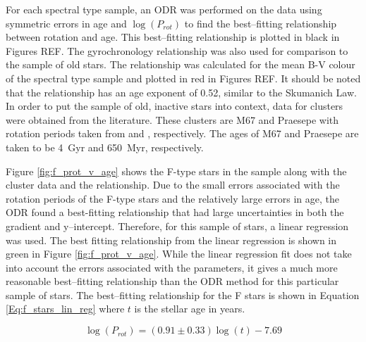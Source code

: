 For each spectral type sample, an ODR was performed on the data using symmetric errors in age and $\log(P_{rot})$ to find the best--fitting relationship between rotation and age. This best--fitting relationship is plotted in black in Figures REF. The \citet{Barnes_2007} gyrochronology relationship was also used for comparison to the sample of old stars. The \citet{Barnes_2007} relationship was calculated for the mean B-V colour of the spectral type sample and plotted in red in Figures REF. It should be noted that the \citet{Barnes_2007} relationship has an age exponent of 0.52, similar to the Skumanich Law. In order to put the sample of old, inactive stars into context, data for clusters were obtained from the literature. These clusters are M67 and Praesepe with rotation periods taken from \citet{Barnes_etal_2016} and \citet{Douglas_etal_2017}, respectively. The ages of M67 and Praesepe are taken to be 4~Gyr and 650~Myr, respectively.

Figure \ref{fig:f_prot_v_age} shows the F-type stars in the sample along with the cluster data and the \citet{Barnes_2007} relationship. Due to the small errors associated with the rotation periods of the F-type stars and the relatively large errors in age, the ODR found a best-fitting relationship that had large uncertainties in both the gradient and y--intercept. Therefore, for this sample of stars, a linear regression was used. The best fitting relationship from the linear regression is shown in green in Figure \ref{fig:f_prot_v_age}. While the linear regression fit does not take into account the errors associated with the parameters, it gives a much more reasonable best--fitting relationship than the ODR method for this particular sample of stars. The best--fitting relationship for the F stars is shown in Equation \ref{Eq:f_stars_lin_reg} where $t$ is the stellar age in years.

\begin{equation}
    \log(P_{rot}) = (0.91 \pm 0.33)\log(t) -7.69
    \label{Eq:f_stars_lin_reg}
\end{equation}

